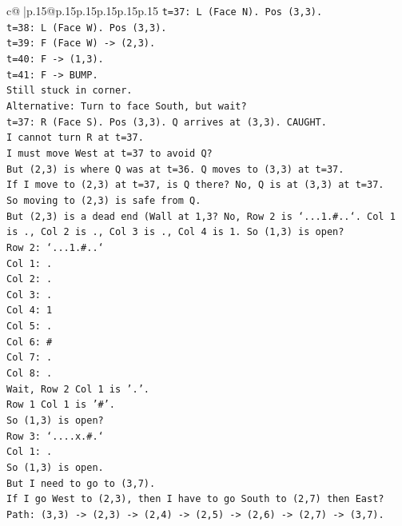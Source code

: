 \documentclass{article}
\begin{document}
{\begin{supertabular}{c@{$\;$}|p{.15\linewidth}@{}p{.15\linewidth}p{.15\linewidth}p{.15\linewidth}p{.15\linewidth}p{.15\linewidth}}
{{{\texttt{t=37: L (Face N). Pos (3,3).} \\
\texttt{t=38: L (Face W). Pos (3,3).} \\
\texttt{t=39: F (Face W) {-}> (2,3).} \\
\texttt{t=40: F {-}> (1,3).} \\
\texttt{t=41: F {-}> BUMP.} \\
\texttt{Still stuck in corner.} \\
\texttt{Alternative: Turn to face South, but wait?} \\
\texttt{t=37: R (Face S). Pos (3,3). Q arrives at (3,3). CAUGHT.} \\
\texttt{I cannot turn R at t=37.} \\
\texttt{I must move West at t=37 to avoid Q?} \\
\texttt{But (2,3) is where Q was at t=36. Q moves to (3,3) at t=37.} \\
\texttt{If I move to (2,3) at t=37, is Q there? No, Q is at (3,3) at t=37.} \\
\texttt{So moving to (2,3) is safe from Q.} \\
\texttt{But (2,3) is a dead end (Wall at 1,3? No, Row 2 is `...1.\#..`. Col 1 is ., Col 2 is ., Col 3 is ., Col 4 is 1. So (1,3) is open?} \\
\texttt{Row 2: `...1.\#..`} \\
\texttt{Col 1: .} \\
\texttt{Col 2: .} \\
\texttt{Col 3: .} \\
\texttt{Col 4: 1} \\
\texttt{Col 5: .} \\
\texttt{Col 6: \#} \\
\texttt{Col 7: .} \\
\texttt{Col 8: .} \\
\texttt{Wait, Row 2 Col 1 is '.'.} \\
\texttt{Row 1 Col 1 is '\#'.} \\
\texttt{So (1,3) is open?} \\
\texttt{Row 3: `....x.\#.`} \\
\texttt{Col 1: .} \\
\texttt{So (1,3) is open.} \\
\texttt{But I need to go to (3,7).} \\
\texttt{If I go West to (2,3), then I have to go South to (2,7) then East?} \\
\texttt{Path: (3,3) {-}> (2,3) {-}> (2,4) {-}> (2,5) {-}> (2,6) {-}> (2,7) {-}> (3,7).} \\
}}}
\end{supertabular}}
\end{document}
